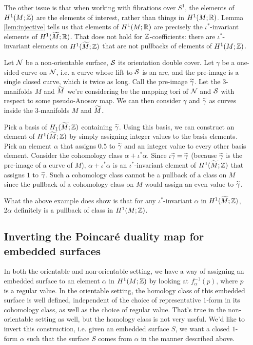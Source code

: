 The other issue is that when working with fibrations over $S^1$, the elements of $H^1(M; \mathbb{Z})$ are
the elements of interest, rather than things in $H^1(M; \mathbb{R})$. Lemma \ref{lem:injective} tells us
that elements of $H^1(M; \mathbb{R})$ are precisely the $\iota^{\ast}$-invariant elements of
$H^1(\widetilde{M}; \mathbb{R})$. That does not hold for $\mathbb{Z}$-coefficients: there are $\iota^{\ast}$-invariant
elements on $H^1(\widetilde{M}; \mathbb{Z})$ that are not pullbacks of elements of $H^1(M; \mathbb{Z})$.
\begin{example}
  Let $\mathcal{N}$ be a non-orientable surface, $\mathcal{S}$ its orientation double cover. Let $\gamma$ be a one-sided curve
  on $\mathcal{N}$, i.e. a curve whose lift to $\mathcal{S}$ is an arc, and the pre-image is a single closed curve, which is
  twice as long. Call the pre-image $\widetilde{\gamma}$. Let the $3$-manifolds $M$ and $\widetilde{M}$ we're
  considering be the mapping tori of $\mathcal{N}$ and $\mathcal{S}$ with respect to some pseudo-Anosov map. We can then
  consider $\gamma$ and $\widetilde{\gamma}$ as curves inside the $3$-manifolds $M$ and $\widetilde{M}$.

  Pick a basis of $H_1(\widetilde{M}; \mathbb{Z})$ containing $\widetilde{\gamma}$. Using this basis, we can construct an element
  of $H^1(\widetilde{M}; \mathbb{Z})$ by simply assigning integer values to the basis elements. Pick an element $\alpha$
  that assigns $0.5$ to $\widetilde{\gamma}$ and an integer value to every other basis element. Consider the
  cohomology class $\alpha + \iota^{\ast}\alpha$. Since $\iota \widetilde{\gamma} = \widetilde{\gamma}$ (because
  $\widetilde{\gamma}$ is the pre-image of a curve of $M$), $\alpha + \iota^{\ast}\alpha$ is an
  $\iota^{\ast}$-invariant element of $H^1(\widetilde{M}; \mathbb{Z})$ that assigns $1$ to $\widetilde{\gamma}$. Such a cohomology
  class cannot be a pullback of a class on $M$ since the pullback of a cohomology class on $M$ would assign an
  even value to $\widetilde{\gamma}$.
\end{example}

What the above example does show is that for any $\iota^{\ast}$-invariant $\alpha$ in
$H^1(\widetilde{M}; \mathbb{Z})$, $2\alpha$ definitely is a pullback of class in $H^1(M; \mathbb{Z})$.

\subsection{Inverting the Poincar\'e duality map for embedded surfaces}
\label{sec:invert-poincare}

In both the orientable and non-orientable setting, we have a way of assigning an embedded surface
to an element $\alpha$ in $H^1(M; \mathbb{Z})$ by looking at $f_{\alpha}^{-1}(p)$, where $p$ is a regular
value. In the orientable setting, the homology class of this embedded surface is well defined,
independent of the choice of representative $1$-form in its cohomology class, as well as the choice
of regular value. That's true in the non-orientable setting as well, but the homology class is not
very useful. We'd like to invert this construction, i.e. given an embedded surface $S$, we want a
closed $1$-form $\alpha$ such that the surface $S$ comes from $\alpha$ in the manner described
above.

